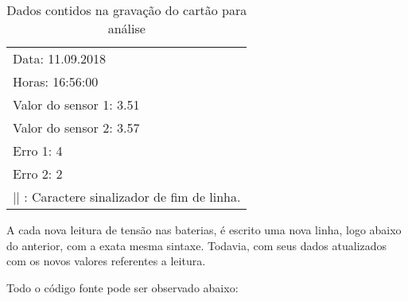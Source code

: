 \begin{table}[htp]
\caption{Dados contidos na gravação do cartão para análise}
\vspace{0.5cm}
\label{tabela:tabela_dados_contidos_na_gravacao}
\centering
\begin{tabular}{|
>{\columncolor[HTML]{EFEFEF}}l |}
Data: 11.09.2018                            \\
Horas: 16:56:00                             \\
Valor do sensor 1: 3.51                     \\
Valor do sensor 2: 3.57                     \\
Erro 1: 4                                   \\
Erro 2: 2                                   \\
|| : Caractere sinalizador de fim de linha.
\end{tabular}
\end{table}


{
A cada nova leitura de tensão nas baterias, é escrito uma nova linha, logo abaixo do anterior, com a exata mesma sintaxe. Todavia, com seus dados atualizados com os novos valores referentes a leitura. 
}

{
Todo o código fonte pode ser observado abaixo: \newline
}


